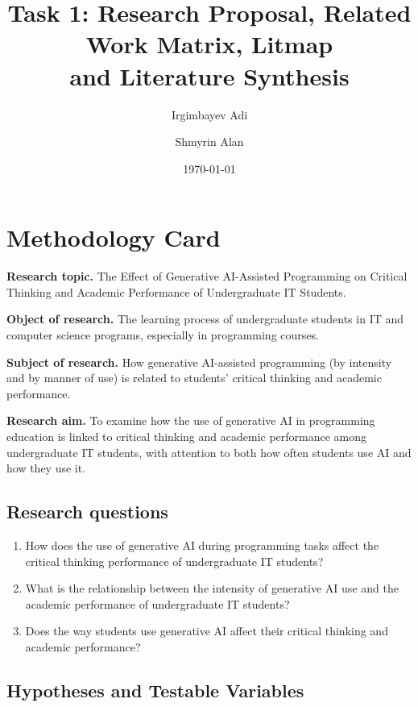 \documentclass[11pt,a4paper]{article}
\title{\textbf{Task 1:} Research Proposal, Related Work Matrix, Litmap \\and Literature Synthesis}
\author{Irgimbayev Adi \and Shmyrin Alan}
\date{\today}
\begin{document}
\maketitle

\section{Methodology Card}

\textbf{Research topic.}
The Effect of Generative AI-Assisted Programming on Critical Thinking and Academic Performance of Undergraduate IT Students.

\textbf{Object of research.}
The learning process of undergraduate students in IT and computer science programs, especially in programming courses.

\textbf{Subject of research.}
How generative AI-assisted programming (by intensity and by manner of use) is related to students' critical thinking and academic performance.

\textbf{Research aim.}
To examine how the use of generative AI in programming education is linked to critical thinking and academic performance among undergraduate IT students, with attention to both how often students use AI and how they use it.


\subsection*{Research questions}
\begin{enumerate}[leftmargin=*, itemsep=0.2em]
  \item[\textbf{RQ1}] How does the use of generative AI during programming tasks affect the critical thinking performance of undergraduate IT students?
  \item[\textbf{RQ2}] What is the relationship between the intensity of generative AI use and the academic performance of undergraduate IT students?
  \item[\textbf{RQ3}] Does the way students use generative AI affect their critical thinking and academic performance?
\end{enumerate}

\subsection*{Hypotheses and Testable Variables}
\end{document}
